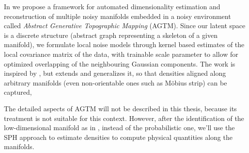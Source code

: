 In \citet{Canducci2021} we propose a framework for automated dimensionality estimation and reconstruction
of multiple noisy manifolds embedded in a noisy environment called \emph{Abstract Generative Topographic Mapping} (AGTM).
Since our latent space is a discrete structure (abstract graph representing a skeleton of a given manifold),
we formulate local noise models through kernel based estimates of the local covariance matrix of the data,
with trainable scale parameter to allow for optimized overlapping of the neighbouring Gaussian components.
The work is inspired by \cite{10.1007/978-3-540-87481-2_37}, but extends and generalizes it, so that densities aligned along arbitrary manifolds (even non-orientable ones such as M\"{o}bius strip) can be captured,

The detailed aspects of AGTM will not be described in this thesis, because its treatment is not suitable for this context.
However, after the identification of the low-dimensional manifold as in \citet{Canducci2021}, instead of the probabilistic one, we'll use the SPH approach to estimate densities to compute physical quantities along the manifolds.



